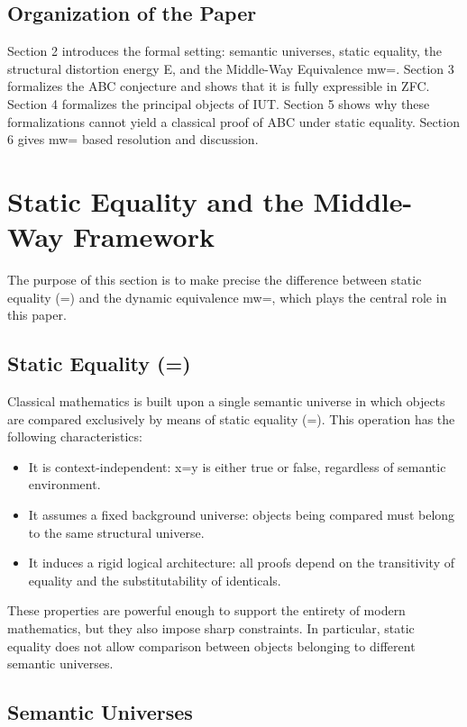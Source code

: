 \documentclass[11pt]{article}
\begin{document}
\subsection{Organization of the Paper}

Section 2 introduces the formal setting: semantic universes, static
equality, the structural distortion energy E, and the Middle-Way
Equivalence mw=. Section 3 formalizes the ABC conjecture and shows that
it is fully expressible in ZFC. Section 4 formalizes the principal
objects of IUT. Section 5 shows why these formalizations cannot yield a
classical proof of ABC under static equality. Section 6 gives mw= based
resolution and discussion.

\section{Static Equality and the Middle-Way Framework}

The purpose of this section is to make precise the difference between
static equality (=) and the dynamic equivalence mw=, which plays the
central role in this paper.

\subsection{Static Equality (=)}

Classical mathematics is built upon a single semantic universe in which
objects are compared exclusively by means of static equality (=).
This operation has the following characteristics:

\begin{itemize}
\item[(E1)] It is context-independent: x=y is either true or false, 
regardless of semantic environment.
\item[(E2)] It assumes a fixed background universe: objects being compared
must belong to the same structural universe.
\item[(E3)] It induces a rigid logical architecture: all proofs depend
on the transitivity of equality and the substitutability of identicals.
\end{itemize}

These properties are powerful enough to support the entirety of modern
mathematics, but they also impose sharp constraints. In particular,
static equality does not allow comparison between objects belonging to
different semantic universes.

\subsection{Semantic Universes}
\end{document}
